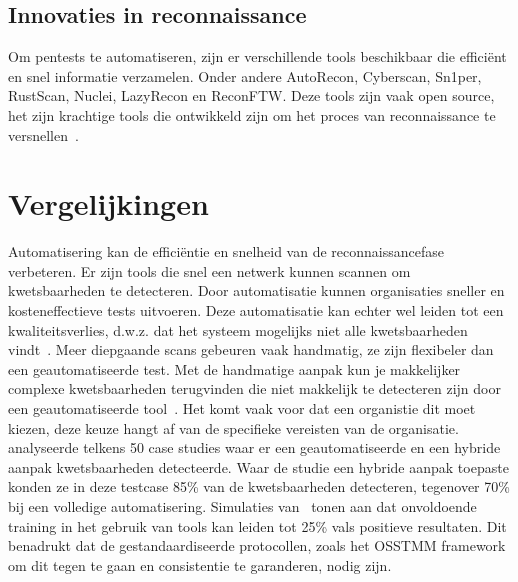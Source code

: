 \subsection{Innovaties in reconnaissance}
Om pentests te automatiseren, zijn er verschillende tools beschikbaar die efficiënt en snel informatie verzamelen. 
Onder andere AutoRecon, Cyberscan, Sn1per, RustScan, Nuclei, LazyRecon en ReconFTW. Deze tools zijn vaak open source, het zijn krachtige tools die ontwikkeld zijn om het proces van reconnaissance te versnellen~\autocite{Shebli}.

\section{Vergelijkingen}
Automatisering kan de efficiëntie en snelheid van de reconnaissancefase verbeteren. Er zijn tools die snel een netwerk kunnen scannen om kwetsbaarheden te detecteren. 
Door automatisatie kunnen organisaties sneller en kosteneffectieve tests uitvoeren. Deze automatisatie kan echter wel leiden tot een kwaliteitsverlies, d.w.z. dat het systeem mogelijks niet alle kwetsbaarheden vindt~\autocite{peris}. 
Meer diepgaande scans gebeuren vaak handmatig, ze zijn flexibeler dan een geautomatiseerde test. Met de handmatige aanpak kun je makkelijker complexe kwetsbaarheden terugvinden die niet makkelijk te detecteren zijn door een geautomatiseerde tool~\autocite{Altulaihan2023}. 
Het komt vaak voor dat een organistie dit moet kiezen,
deze keuze hangt af van de specifieke vereisten van de organisatie.~\textcite{Monero2025} analyseerde telkens 50 case studies waar er een geautomatiseerde en een hybride aanpak kwetsbaarheden detecteerde. Waar de studie een hybride aanpak toepaste konden ze in deze testcase 85\% van de kwetsbaarheden detecteren, tegenover 70\% bij een volledige automatisering.
Simulaties van~\textcite{Whitaker2005} tonen aan dat onvoldoende training in het gebruik van tools kan leiden tot 25\% vals positieve resultaten.
Dit benadrukt dat de gestandaardiseerde protocollen, zoals het OSSTMM framework om dit tegen te gaan en consistentie te garanderen, nodig zijn.

